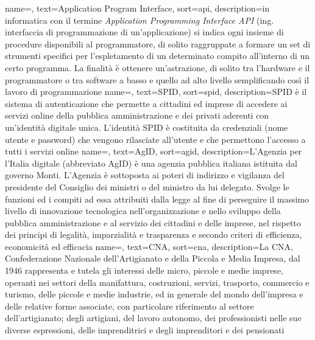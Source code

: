 
\renewcommand{\acronymname}{Acronimi e abbreviazioni}


\renewcommand{\glossaryname}{Glossario}

{
    name=,
    text=Application Program Interface,
    sort=api,
    description={in informatica con il termine \emph{Application Programming Interface API} (ing. interfaccia di programmazione di un'applicazione) si indica ogni insieme di procedure disponibili al programmatore, di solito raggruppate a formare un set di strumenti specifici per l'espletamento di un determinato compito all'interno di un certo programma. La finalità è ottenere un'astrazione, di solito tra l'hardware e il programmatore o tra software a basso e quello ad alto livello semplificando così il lavoro di programmazione}
}
{
	name=,
	text=SPID,
	sort=spid,
	description={SPID è il sistema di autenticazione che permette a cittadini ed imprese di accedere ai servizi online della pubblica amministrazione e dei privati aderenti con un’identità digitale unica. L’identità SPID è costituita da credenziali (nome utente e password) che vengono rilasciate all’utente e che permettono l’accesso a tutti i servizi online}
}
{
	name=,
	text=AgID,
	sort=agid,
	description={L'Agenzia per l'Italia digitale (abbreviato AgID) è una agenzia pubblica italiana istituita dal governo Monti. L'Agenzia è sottoposta ai poteri di indirizzo e vigilanza del presidente del Consiglio dei ministri o del ministro da lui delegato. Svolge le funzioni ed i compiti ad essa attribuiti dalla legge al fine di perseguire il massimo livello di innovazione tecnologica nell'organizzazione e nello sviluppo della pubblica amministrazione e al servizio dei cittadini e delle imprese, nel rispetto dei principi di legalità, imparzialità e trasparenza e secondo criteri di efficienza, economicità ed efficacia}
}
{
	name=,
	text=CNA,
	sort=cna,
	description={La CNA, Confederazione Nazionale dell'Artigianato e della Piccola e Media Impresa, dal 1946 rappresenta e tutela gli interessi delle micro, piccole e medie imprese, operanti nei settori della manifattura, costruzioni, servizi, trasporto, commercio e turismo, delle piccole e medie industrie, ed in generale del mondo dell’impresa e delle relative forme associate, con particolare riferimento al settore dell’artigianato; degli artigiani, del lavoro autonomo, dei professionisti  nelle sue diverse espressioni, delle imprenditrici e degli imprenditori e dei pensionati}
}
